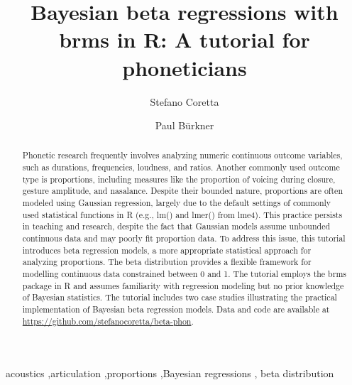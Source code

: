 \documentclass[
  authoryear,
  preprint,
  3p]{elsarticle}
\begin{document}
\begin{frontmatter}
\title{Bayesian beta regressions with brms in R: A tutorial for
phoneticians}
\author[1]{Stefano Coretta%
%
}
\author[2]{Paul Bürkner%
%
}



        
\begin{abstract}
Phonetic research frequently involves analyzing numeric continuous
outcome variables, such as durations, frequencies, loudness, and ratios.
Another commonly used outcome type is proportions, including measures
like the proportion of voicing during closure, gesture amplitude, and
nasalance. Despite their bounded nature, proportions are often modeled
using Gaussian regression, largely due to the default settings of
commonly used statistical functions in R (e.g., lm() and lmer() from
lme4). This practice persists in teaching and research, despite the fact
that Gaussian models assume unbounded continuous data and may poorly fit
proportion data. To address this issue, this tutorial introduces beta
regression models, a more appropriate statistical approach for analyzing
proportions. The beta distribution provides a flexible framework for
modelling continuous data constrained between 0 and 1. The tutorial
employs the brms package in R and assumes familiarity with regression
modeling but no prior knowledge of Bayesian statistics. The tutorial
includes two case studies illustrating the practical implementation of
Bayesian beta regression models. Data and code are available at
\url{https://github.com/stefanocoretta/beta-phon}.
\end{abstract}





\begin{keyword}
    acoustics \sep articulation \sep proportions \sep Bayesian
regressions \sep 
    beta distribution
\end{keyword}
\end{frontmatter}
    
\end{document}
